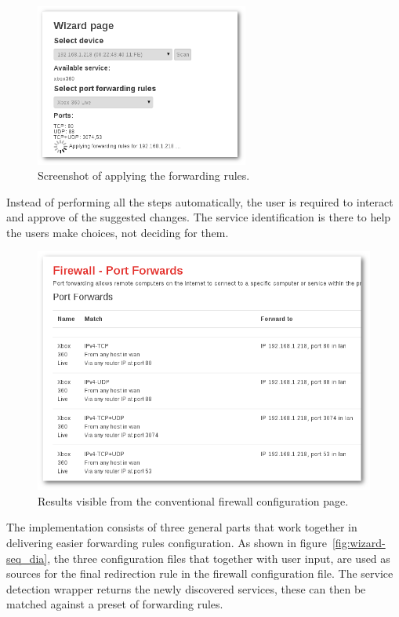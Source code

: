 \documentclass[a4paper,11pt,makeidx]{kth-bcs}
\begin{document}
\begin{figure}[h]
   \centering
   \includegraphics[width=7cm]{ss-applying-shadow}
   \caption{Screenshot of applying the forwarding rules.}
   \label{fig:applying}
\end{figure}

Instead of performing all the steps automatically, the user is required to interact and approve of the suggested changes.
The service identification is there to help the users make choices, not deciding for them.

\begin{figure}[h]
   \centering
   \includegraphics[width=13cm]{ss-results-shadow.png}
   \caption{Results visible from the conventional firewall configuration page.}
   \label{fig:results}
\end{figure}

The implementation consists of three general parts that work together in delivering easier forwarding rules configuration.
As shown in figure~\ref{fig:wizard-seq_dia}, the three configuration files that together with user input, are used as sources for the final redirection rule in the firewall configuration file.
The service detection wrapper returns the newly discovered services, these can then be matched against a preset of forwarding rules.
\end{document}
